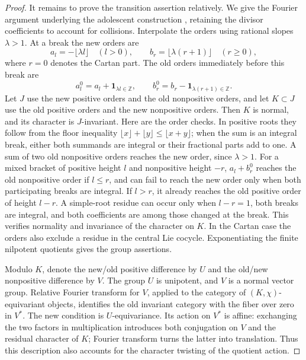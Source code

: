 \documentclass[11pt]{article}
\numberwithin{equation}{section}
\theoremstyle{definition}
\theoremstyle{remark}
\begin{document}
\begin{proof}
It remains to prove the transition assertion relatively.  We give the
Fourier argument underlying the adolescent construction
\cite[Section~2]{RaskinW}, retaining the divisor coefficients to account
for collisions.  Interpolate the orders using rational slopes
\(\lambda>1\).  At a break the new orders are
\[
 a_l=-\lfloor\lambda l\rfloor\quad(l>0),\qquad
 b_r=\lfloor\lambda(r+1)\rfloor\quad(r\geq0),
\]
where \(r=0\) denotes the Cartan part.  The old orders immediately
before this break are
\[
 a_l^0=a_l+\mathbf1_{\lambda l\in\mathbb Z},\qquad
 b_r^0=b_r-\mathbf1_{\lambda(r+1)\in\mathbb Z}.
\]
Let \(J\) use the new positive orders and the old nonpositive orders,
and let \(K\subset J\) use the old positive orders and the new
nonpositive orders.  Then \(K\) is normal, and its character is
\(J\)-invariant.  Here are the order checks.  In positive roots they
follow from the floor inequality
\(\lfloor x\rfloor+\lfloor y\rfloor\leq\lfloor x+y\rfloor\);
when the sum is an integral break, either both summands are integral
or their fractional parts add to one.  A sum of two old nonpositive
orders reaches the new order, since \(\lambda>1\).  For a mixed
bracket of positive height \(l\) and nonpositive height \(-r\),
\(a_l+b_r^0\) reaches the old nonpositive order if \(l\leq r\),
and can fail to reach the new order only when both participating
breaks are integral.  If \(l>r\), it already reaches the old positive
order of height \(l-r\).  A simple-root residue can occur only when
\(l-r=1\), both breaks are integral, and both coefficients are among
those changed at the break.  This verifies normality and invariance
of the character on \(K\).  In the Cartan case the orders also exclude
a residue in the central Lie cocycle.  Exponentiating the finite
nilpotent quotients gives the group assertions.

Modulo \(K\), denote the new/old positive difference by \(U\) and the
old/new nonpositive difference by \(V\).  The group \(U\) is unipotent,
and \(V\) is a normal vector group.  Relative Fourier transform for
\(V\), applied to the category of \((K,\chi)\)-equivariant objects,
identifies the old invariant category with the fiber over zero in
\(V^*\).  The new condition is \(U\)-equivariance.  Its action on
\(V^*\) is affine: exchanging the two factors in multiplication
introduces both conjugation on \(V\) and the residual character of
\(K\); Fourier transform turns the latter into translation.  Thus
this description also accounts for the character twisting of the
quotient action.


\end{proof}
\end{document}
